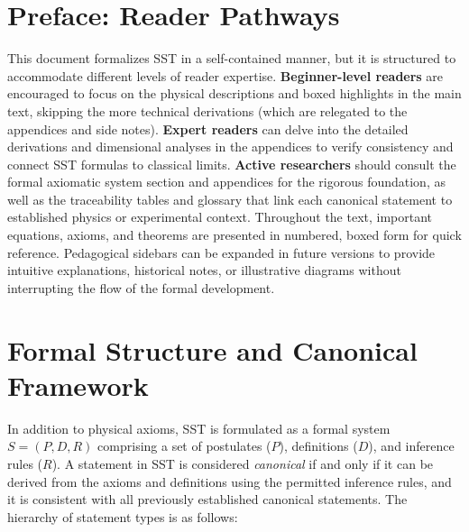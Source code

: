 \documentclass[reprint,aps,onecolumn,nofootinbib]{revtex4-2}
\begin{document}
	\section*{Preface: Reader Pathways}
	This document formalizes SST in a self-contained manner, but it is structured to accommodate different levels of reader expertise.
        \textbf{Beginner-level readers} are encouraged to focus on the physical descriptions and boxed highlights in the main text, skipping the more technical derivations (which are relegated to the appendices and side notes).
        \textbf{Expert readers} can delve into the detailed derivations and dimensional analyses in the appendices to verify consistency and connect SST formulas to classical limits.
        \textbf{Active researchers} should consult the formal axiomatic system section and appendices for the rigorous foundation, as well as the traceability tables and glossary that link each canonical statement to established physics or experimental context. Throughout the text, important equations, axioms, and theorems are presented in numbered, boxed form for quick reference. Pedagogical sidebars can be expanded in future versions to provide intuitive explanations, historical notes, or illustrative diagrams without interrupting the flow of the formal development.


	\section{Formal Structure and Canonical Framework}
	In addition to physical axioms, SST is formulated as a formal system $S = (P, D, R)$ comprising a set of postulates ($P$), definitions ($D$), and inference rules ($R$). A statement in SST is considered \emph{canonical} if and only if it can be derived from the axioms and definitions using the permitted inference rules, and it is consistent with all previously established canonical statements. The hierarchy of statement types is as follows:
\end{document}
